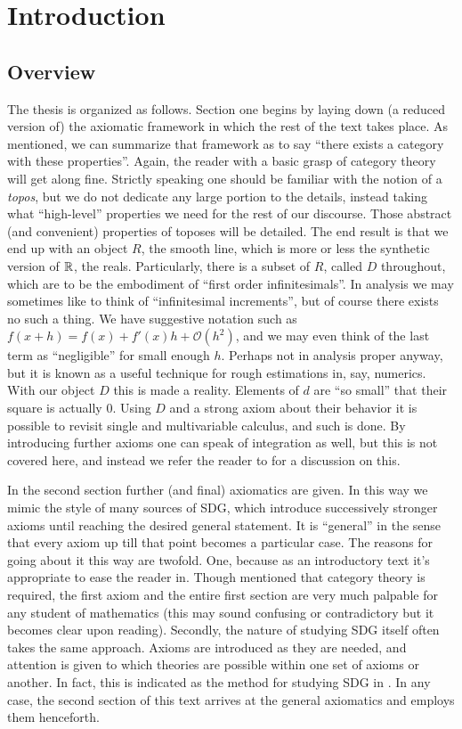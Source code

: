 \chapter{Introduction}

\section{Overview}

The thesis is organized as follows. Section one begins by laying down (a reduced version of) the axiomatic framework in which the rest of the text takes place. As mentioned, we can summarize that framework as to say ``there exists a category with these properties''. Again, the reader with a basic grasp of category theory will get along fine. Strictly speaking one should be familiar with the notion of a \emph{topos}, but we do not dedicate any large portion to the details, instead taking what ``high-level'' properties we need for the rest of our discourse. Those abstract (and convenient) properties of toposes will be detailed. The end result is that we end up with an object \( R \), the smooth line, which is more or less the synthetic version of \( \mathbb{R} \), the reals. Particularly, there is a subset of \( R \), called \( D \) throughout, which are to be the embodiment of ``first order infinitesimals''. In analysis we may sometimes like to think of ``infinitesimal increments'', but of course there exists no such a thing. We have suggestive notation such as \( f(x+h) = f(x) + f'(x)h + \mathcal O(h^2) \), and we may even think of the last term as ``negligible'' for small enough \( h \). Perhaps not in analysis proper anyway, but it is known as a useful technique for rough estimations in, say, numerics. With our object \( D \) this is made a reality. Elements of \( d \) are ``so small'' that their square is actually \( 0 \). Using \( D \) and a strong axiom about their behavior it is possible to revisit single and multivariable calculus, and such is done. By introducing further axioms one can speak of integration as well, but this is not covered here, and instead we refer the reader to \cite{lav96} for a discussion on this.

In the second section further (and final) axiomatics are given. In this way we mimic the style of many sources of SDG, which introduce successively stronger axioms until reaching the desired general statement. It is ``general'' in the sense that every axiom up till that point becomes a particular case. The reasons for going about it this way are twofold. One, because as an introductory text it's appropriate to ease the reader in. Though mentioned that category theory is required, the first axiom and the entire first section are very much palpable for any student of mathematics (this may sound confusing or contradictory but it becomes clear upon reading). Secondly, the nature of studying SDG itself often takes the same approach. Axioms are introduced as they are needed, and attention is given to which theories are possible within one set of axioms or another. In fact, this is indicated as the method for studying SDG in \cite{bun17}. In any case, the second section of this text arrives at the general axiomatics and employs them henceforth.

